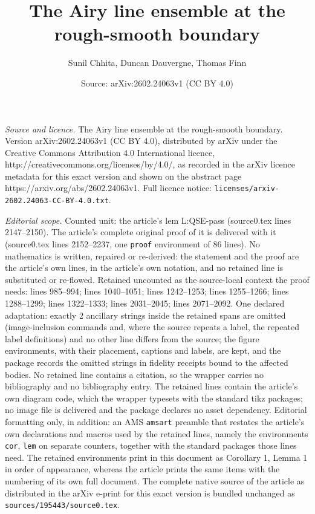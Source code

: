 \documentclass[10pt,a4paper]{amsart}
\title{The Airy line ensemble at the rough-smooth boundary}
\author{Sunil Chhita, Duncan Dauvergne, Thomas Finn}
\date{Source: arXiv:2602.24063v1 (CC BY 4.0)}
\begin{document}
\maketitle

\noindent\emph{Source and licence.} The Airy line ensemble at the rough-smooth boundary. Version arXiv:2602.24063v1 (CC BY 4.0), distributed by arXiv under the Creative Commons Attribution 4.0 International licence, http://creativecommons.org/licenses/by/4.0/, as recorded in the arXiv licence metadata for this exact version and shown on the abstract page https://arxiv.org/abs/2602.24063v1. Full licence notice: \texttt{licenses/arxiv-2602.24063-CC-BY-4.0.txt}.\par\smallskip

\noindent\textit{Editorial scope.} Counted unit: the article's lem L:QSE-pass (source0.tex lines 2147--2150). The article's complete original proof of it is delivered with it (source0.tex lines 2152--2237, one \texttt{proof} environment of 86 lines). No mathematics is written, repaired or re-derived: the statement and the proof are the article's own lines, in the article's own notation, and no retained line is substituted or re-flowed.  Retained uncounted as the source-local context the proof needs: lines 985--994; lines 1040--1051; lines 1242--1253; lines 1255--1266; lines 1288--1299; lines 1322--1333; lines 2031--2045; lines 2071--2092.  One declared adaptation: exactly 2 ancillary strings inside the retained spans are omitted (image-inclusion commands and, where the source repeats a label, the repeated label definitions) and no other line differs from the source; the figure environments, with their placement, captions and labels, are kept, and the package records the omitted strings in fidelity receipts bound to the affected bodies.  No retained line contains a citation, so the wrapper carries no bibliography and no bibliography entry.  The retained lines contain the article's own diagram code, which the wrapper typesets with the standard tikz packages; no image file is delivered and the package declares no asset dependency.  Editorial formatting only, in addition: an AMS \texttt{amsart} preamble that restates the article's own declarations and macros used by the retained lines, namely the environments \texttt{cor}, \texttt{lem} on separate counters, together with the standard packages those lines need.  The retained environments print in this document as Corollary 1, Lemma 1 in order of appearance, whereas the article prints the same items with the numbering of its own full document.  The complete native source of the article as distributed in the arXiv e-print for this exact version is bundled unchanged as \texttt{sources/195443/source0.tex}.
\end{document}

